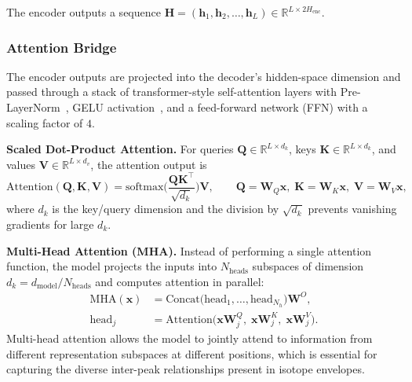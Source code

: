 \documentclass[12pt,a4paper]{report}
\begin{document}
The encoder outputs a sequence $\mathbf{H} = (\mathbf{h}_1, \mathbf{h}_2, \dots, \mathbf{h}_L) \in \mathbb{R}^{L \times 2H_{\mathrm{enc}}}$.

\bigskip
\subsubsection{Attention Bridge}

The encoder outputs are projected into the decoder's hidden-space dimension and passed through a stack of transformer-style self-attention layers with Pre-LayerNorm~\cite{preln}, GELU activation~\cite{gelu}, and a feed-forward network (FFN) with a scaling factor of $4$.

\textbf{Scaled Dot-Product Attention.}  For queries $\mathbf{Q} \in \mathbb{R}^{L \times d_k}$, keys $\mathbf{K} \in \mathbb{R}^{L \times d_k}$, and values $\mathbf{V} \in \mathbb{R}^{L \times d_v}$, the attention output is
\begin{equation}
  \text{Attention}(\mathbf{Q}, \mathbf{K}, \mathbf{V})
  = \text{softmax}\!\Big( \frac{\mathbf{Q}\mathbf{K}^\top}{\sqrt{d_k}} \Big)\mathbf{V},
  \qquad \mathbf{Q} = \mathbf{W}_Q\mathbf{x},\; \mathbf{K} = \mathbf{W}_K\mathbf{x},\; \mathbf{V} = \mathbf{W}_V\mathbf{x},
  \label{eq:attention}
\end{equation}
where $d_k$ is the key/query dimension and the division by $\sqrt{d_k}$ prevents vanishing gradients for large $d_k$.

\textbf{Multi-Head Attention (MHA).}  Instead of performing a single attention function, the model projects the inputs into $N_{\mathrm{heads}}$ subspaces of dimension $d_k = d_{\mathrm{model}} / N_{\mathrm{heads}}$ and computes attention in parallel:
\begin{align}
  \text{MHA}(\mathbf{x}) &= \text{Concat}\!\big(\text{head}_1, \dots, \text{head}_{N_h}\big)\mathbf{W}^O, \label{eq:mha} \\
  \text{head}_j &= \text{Attention}\!\big(\mathbf{x}\mathbf{W}_j^Q,\; \mathbf{x}\mathbf{W}_j^K,\; \mathbf{x}\mathbf{W}_j^V\big). \label{eq:mha_head}
\end{align}
Multi-head attention allows the model to jointly attend to information from different representation subspaces at different positions, which is essential for capturing the diverse inter-peak relationships present in isotope envelopes.
\end{document}
